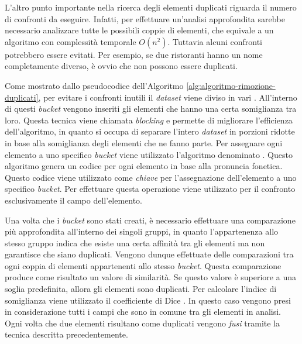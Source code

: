 L'altro punto importante nella ricerca degli elementi duplicati riguarda il numero di confronti da eseguire. Infatti, per effettuare un'analisi approfondita sarebbe necessario analizzare tutte le possibili coppie di elementi, che equivale a un algoritmo con complessità temporale $ O(n^2) $. Tuttavia alcuni confronti potrebbero essere evitati. Per esempio, se due ristoranti hanno un nome completamente diverso, è ovvio che non possono essere duplicati.

Come mostrato dallo pseudocodice dell'Algoritmo \ref{alg:algoritmo-rimozione-duplicati}, per evitare i confronti inutili il \emph{dataset} viene diviso in vari . All'interno di questi \emph{bucket} vengono inseriti gli elementi che hanno una certa somiglianza tra loro. Questa tecnica viene chiamata \emph{blocking} \cite{elmagarmid2007duplicate} e permette di migliorare l'efficienza dell'algoritmo, in quanto si occupa di separare l'intero \emph{dataset} in porzioni ridotte in base alla somiglianza degli elementi che ne fanno parte. Per assegnare ogni elemento a uno specifico \emph{bucket} viene utilizzato l'algoritmo denominato  \cite{odell1918soundex}. Questo algoritmo genera un codice per ogni elemento in base alla pronuncia fonetica. Questo codice viene utilizzato come \emph{chiave} per l'assegnazione dell'elemento a uno specifico \emph{bucket}. Per effettuare questa operazione viene utilizzato per il confronto esclusivamente il campo  dell'elemento.

Una volta che i \emph{bucket} sono stati creati, è necessario effettuare una comparazione più approfondita all'interno dei singoli gruppi, in quanto l'appartenenza allo stesso gruppo indica che esiste una certa affinità tra gli elementi ma non garantisce che siano duplicati. Vengono dunque effettuate delle comparazioni tra ogni coppia di elementi appartenenti allo stesso \emph{bucket}. Questa comparazione produce come risultato un valore di similarità. Se questo valore è superiore a una soglia predefinita, allora gli elementi sono duplicati. Per calcolare l'indice di somiglianza viene utilizzato il coefficiente di Dice \cite{dice1945measures}. In questo caso vengono presi in considerazione tutti i campi che sono in comune tra gli elementi in analisi. Ogni volta che due elementi risultano come duplicati vengono \emph{fusi} tramite la tecnica descritta precedentemente.

